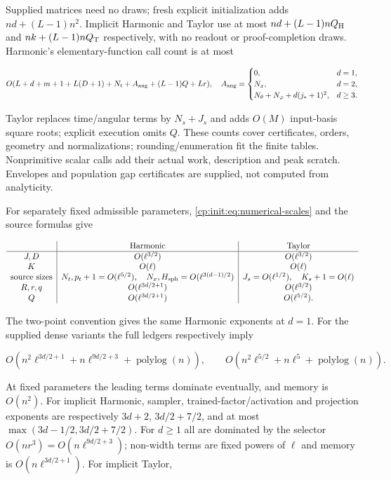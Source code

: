 Supplied matrices need no draws; fresh explicit initialization adds
$nd+(L-1)n^2$. Implicit Harmonic and Taylor use at most
$nd+(L-1)nQ_{\rm H}$ and $nk+(L-1)nQ_{\rm T}$ respectively,
with no readout or proof-completion draws. Harmonic's elementary-function
call count is at most

\[
O(L+d+m+1+L(D+1)+N_t+A_{\rm ang}+(L-1)Q+Lr),\quad
A_{\rm ang}=\begin{cases}
0,&d=1,\\N_x,&d=2,\\
N_\theta+N_\varphi+d(j_*+1)^2,&d\ge3.
\end{cases}
\]

Taylor replaces time/angular terms by $N_s+J_s$ and adds $O(M)$
input-basis square roots; explicit execution omits $Q$.
These counts cover certificates, orders, geometry and normalizations;
rounding/enumeration fit the finite tables. Nonprimitive scalar calls add
their actual work, description and peak scratch. Envelopes and population
gap certificates are supplied, not computed from analyticity.

For separately fixed admissible parameters,
\eqref{cp:init:eq:numerical-scales} and the source formulas give

\begin{equation}
\label{cp:init:eq:all-orders}
\begin{array}{c|c|c}
&\text{Harmonic}&\text{Taylor}\\ \hline
J,D& O(\ell^{3/2})&O(\ell^{3/2})\\
K&O(\ell)&O(\ell)\\
\text{source sizes}&N_t,p_t+1=O(\ell^{5/2}),\quad
 N_x,H_{\rm sph}=O(\ell^{3(d-1)/2})&
 J_s=O(\ell^{1/2}),\quad K_s+1=O(\ell)\\
R,r,q&O(\ell^{3d/2+1})&O(\ell^{3/2})\\
Q&O(\ell^{3d/2+1})&O(\ell^{5/2}).
\end{array}
\end{equation}

The two-point convention gives the same Harmonic exponents at $d=1$.
For the supplied dense variants the full ledgers respectively imply

\[
O(n^2\ell^{3d/2+1}+n\ell^{9d/2+3}+\operatorname{polylog}(n)),\qquad
O(n^2\ell^{5/2}+n\ell^5+\operatorname{polylog}(n)).
\]

At fixed parameters the leading terms dominate eventually, and memory
is $O(n^2)$. For implicit Harmonic, sampler, trained-factor/activation
and projection exponents are respectively $3d+2$, $3d/2+7/2$,
and at most $\max(3d-1/2,3d/2+7/2)$. For $d\ge1$ all are
dominated by the selector $O(nr^3)=O(n\ell^{9d/2+3})$;
non-width terms are fixed powers of $\ell$ and memory is
$O(n\ell^{3d/2+1})$. For implicit Taylor,

